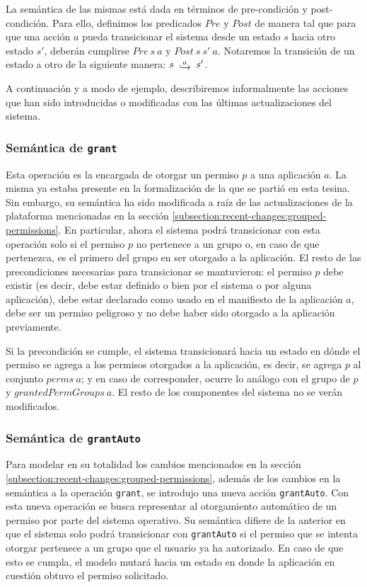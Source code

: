 

La semántica de las mismas está dada en términos de pre-condición y post-condición. Para ello,
definimos los predicados $Pre$ y $Post$ de manera tal que para que una acción $a$ pueda transicionar
el sistema desde un estado $s$ hacia otro estado $s'$, deberán cumplirse $Pre\ s\ a$ y $Post\ s\ s'\
    a$. Notaremos la transición de un estado a otro de la siguiente manera: $s\ \step{a}\ s'$.

A continuación y a modo de ejemplo, describiremos informalmente las acciones que han sido
introducidas o modificadas con las últimas actualizaciones del sistema.

\subsubsection{Semántica de \texttt{grant}}

Esta operación es la encargada de otorgar un permiso $p$ a una aplicación $a$. La misma ya estaba
presente en la formalización de la que se partió en esta tesina. Sin embargo, su semántica ha sido
modificada a raíz de las actualizaciones de la plataforma mencionadas en la sección
\ref{subsection:recent-changes:grouped-permissions}. En particular, ahora el sistema podrá
transicionar con esta operación solo si  el permiso $p$ no pertenece a un grupo o, en caso de que
pertenezca, es el primero del grupo en ser otorgado a la aplicación. El resto de las precondiciones
necesarias para transicionar se mantuvieron: el permiso $p$ debe existir (es decir, debe estar
definido o bien por el sistema o por alguna aplicación), debe estar declarado como usado en el
manifiesto de la aplicación $a$, debe ser un permiso peligroso y no debe haber sido otorgado a la
aplicación previamente.

Si la precondición se cumple, el sistema transicionará hacia un estado en dónde el permiso se agrega
a los permisos otorgados a la aplicación, es decir, se agrega $p$ al conjunto $perms\ a$; y en caso
de corresponder, ocurre lo análogo con el grupo de $p$ y $grantedPermGroups\ a$. El resto de los
componentes del sistema no se verán modificados.

\subsubsection{Semántica de \texttt{grantAuto}}

Para modelar en su totalidad los cambios mencionados en la sección
\ref{subsection:recent-changes:grouped-permissions}, además de los cambios en la semántica a la
operación \texttt{grant}, se introdujo una nueva acción \texttt{grantAuto}. Con esta nueva operación
se busca representar al otorgamiento automático de un permiso por parte del sistema operativo. Su
semántica difiere de la anterior en que el sistema solo podrá transicionar con \texttt{grantAuto} si
el permiso que se intenta otorgar pertenece a un grupo que el usuario ya ha autorizado. En caso de
que esto se cumpla, el modelo mutará hacia un estado en donde la aplicación en cuestión obtuvo el
permiso solicitado.


